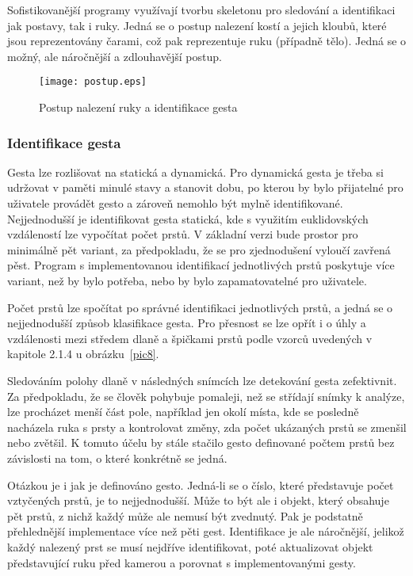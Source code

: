 Sofistikovanější programy využívají tvorbu skeletonu pro sledování a identifikaci jak postavy, tak i ruky. Jedná se o postup nalezení kostí a jejich kloubů, které jsou reprezentovány čarami, což pak reprezentuje ruku (případně tělo). Jedná se o možný, ale náročnější a zdlouhavější postup.

\begin{figure}[htp]
\centering
\texttt{[image: postup.eps]}
\caption{Postup nalezení ruky a identifikace gesta }
\label{picPostup}
\end{figure}

\subsubsection{Identifikace gesta}
Gesta lze rozlišovat na statická a dynamická. Pro dynamická gesta je třeba si udržovat v paměti minulé stavy a stanovit dobu, po kterou by bylo přijatelné pro uživatele provádět gesto a zároveň  nemohlo být mylně identifikované. Nejjednodušší je identifikovat gesta statická, kde s využitím euklidovských vzdáleností lze vypočítat počet prstů. V základní verzi bude prostor pro minimálně pět variant, za předpokladu, že se pro zjednodušení vyloučí zavřená pěst. Program s implementovanou identifikací jednotlivých prstů poskytuje více variant, než by bylo potřeba, nebo by bylo zapamatovatelné pro uživatele.

Počet prstů lze spočítat po správné identifikaci jednotlivých prstů, a jedná se o nejjednodušší způsob klasifikace gesta. Pro přesnost se lze opřít i o úhly a vzdálenosti mezi středem dlaně a špičkami prstů podle vzorců uvedených v kapitole 2.1.4 u obrázku~\ref{pic8}.

Sledováním polohy dlaně v následných snímcích lze detekování gesta zefektivnit. Za předpokladu, že se člověk pohybuje pomaleji, než se střídají snímky k analýze, lze procházet menší část pole, například jen okolí místa, kde se posledně nacházela ruka s prsty a kontrolovat změny, zda počet ukázaných prstů se zmenšil nebo zvětšil. K tomuto účelu by stále stačilo gesto definované počtem prstů bez závislosti na tom, o které konkrétně se jedná.

Otázkou je i jak je definováno gesto. Jedná-li se o číslo, které představuje počet vztyčených prstů, je to nejjednodušší. Může to být ale i objekt, který obsahuje pět prstů, z nichž každý může ale nemusí být zvednutý. Pak je podstatně přehlednější implementace více než pěti gest. Identifikace je ale náročnější, jelikož každý nalezený prst se musí nejdříve identifikovat, poté aktualizovat objekt představující ruku před kamerou a porovnat s implementovanými gesty. 

